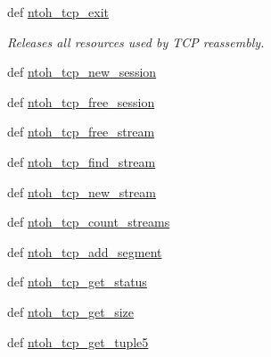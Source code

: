 \begin{DoxyCompactItemize}
def \hyperlink{namespacelibntoh_a213a19bc5e7f81d861aa0784ed68a805}{ntoh\-\_\-tcp\-\_\-exit}
\begin{DoxyCompactList}\small\item\em Releases all resources used by T\-C\-P reassembly. \end{DoxyCompactList}\item 
def \hyperlink{namespacelibntoh_a62260d771e3186e3e59f96859249a121}{ntoh\-\_\-tcp\-\_\-new\-\_\-session}
\item 
def \hyperlink{namespacelibntoh_a8e7ef018eced57f8aec0a1576038944b}{ntoh\-\_\-tcp\-\_\-free\-\_\-session}
\item 
def \hyperlink{namespacelibntoh_aa6b25cb06f262251c7f210c4949f13f2}{ntoh\-\_\-tcp\-\_\-free\-\_\-stream}
\item 
def \hyperlink{namespacelibntoh_a8a187ac0b9c8fd2bb6148125c9c2e66a}{ntoh\-\_\-tcp\-\_\-find\-\_\-stream}
\item 
def \hyperlink{namespacelibntoh_a436bf66ce9902fbbff543582d1771760}{ntoh\-\_\-tcp\-\_\-new\-\_\-stream}
\item 
def \hyperlink{namespacelibntoh_a862d19498bcb4d0485393cf13d2e1ced}{ntoh\-\_\-tcp\-\_\-count\-\_\-streams}
\item 
def \hyperlink{namespacelibntoh_aa11d3df7f8e96c97e8b94817fbdf2c91}{ntoh\-\_\-tcp\-\_\-add\-\_\-segment}
\item 
def \hyperlink{namespacelibntoh_aa6f3eae9edf20f33cbddcee20be23bbb}{ntoh\-\_\-tcp\-\_\-get\-\_\-status}
\item 
def \hyperlink{namespacelibntoh_a981426ebc5be1a01b035a71f56e03113}{ntoh\-\_\-tcp\-\_\-get\-\_\-size}
\item 
def \hyperlink{namespacelibntoh_ad7bb9b76e72995ea8c9de3630a671cb4}{ntoh\-\_\-tcp\-\_\-get\-\_\-tuple5}
\end{DoxyCompactItemize}
